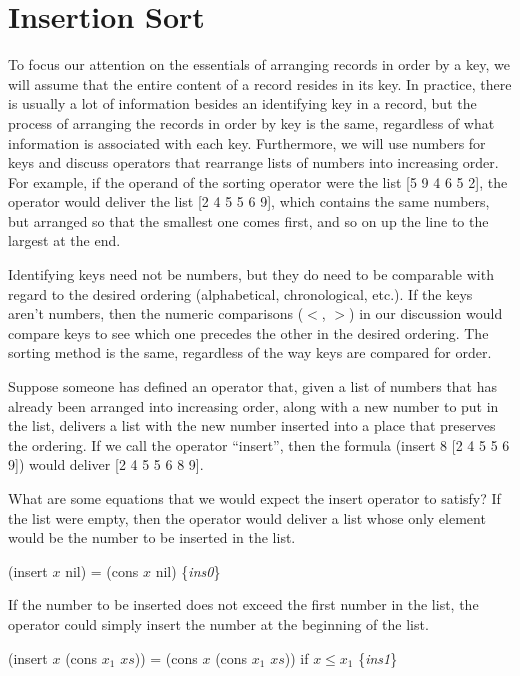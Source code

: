 \section{Insertion Sort}
\label{sec:insertion-sort}

To focus our attention on the essentials of
arranging records in order by a key, we will
assume that the entire content of a record
resides in its key.
In practice, there is usually a lot of information
besides an identifying key in a record,
but the process of arranging the records
in order by key is the same, regardless
of what information is associated with each key.
Furthermore, we will use numbers for keys
and discuss operators that rearrange lists
of numbers into increasing order.
For example, if the operand of the sorting
operator were the list [5 9 4 6 5 2],
the operator would deliver the list [2 4 5 5 6 9],
which contains the same numbers, but arranged so
that the smallest one comes first, and so on up the
line to the largest at the end.

Identifying keys need not be numbers,
but they do need to be comparable
with regard to the desired ordering (alphabetical,
chronological, etc.).
If the keys aren't numbers,
then the numeric comparisons
($<$, $>$) in our discussion would compare
keys to see which one precedes the other
in the desired ordering.
The sorting method is the same, regardless
of the way keys are compared for order.

Suppose someone has defined an operator that,
given a list of numbers that has
already been arranged into increasing order,
along with a new number to put in the list,
delivers a list with the new number inserted
into a place that preserves the ordering.
If we call the operator ``insert'', then
the formula (insert 8 [2 4 5 5 6 9]) would
deliver [2 4 5 5 6 8 9].

What are some equations that we would expect
the insert operator to satisfy?
If the list were empty, then the operator
would deliver a list whose only element would
be the number to be inserted in the list.

\hspace{1cm} (insert $x$ nil) = (cons $x$ nil) \hfill \{\emph{ins0}\}

If the number to be inserted does not exceed the
first number in the list, the operator could simply
insert the number at the beginning of the list.

\hspace{1cm} (insert $x$ (cons $x_1$ $xs$)) = (cons $x$ (cons $x_1$ $xs$)) if $x \le x_1$
\hfill \{\emph{ins1}\}

